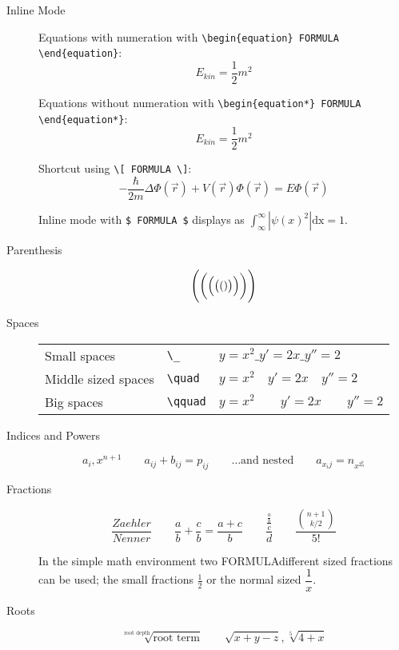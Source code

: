 \documentclass[10pt,a4paper]{scrartcl}
\begin{document}
\begin{description}

\item[Inline Mode]
Equations with numeration with \verb$\begin{equation} FORMULA \end{equation}$:
\begin{equation} 
E_{kin} = \frac 1 2 m^2
\end{equation}

Equations without numeration with \verb$\begin{equation*} FORMULA \end{equation*}$:
\begin{equation*} 
E_{kin} = \frac 1 2 m^2
\end{equation*}

Shortcut using \verb$\[ FORMULA \]$:
\[ -\frac{\hbar}{2m}\Delta\Phi(\vec r) + V(\vec r)\Phi(\vec r) = E\Phi(\vec r) \]

Inline mode with \verb|$ FORMULA $| displays as 
$\int_\infty^\infty |\psi(x)^2|\mathrm{dx} = 1$.

\item[Parenthesis]
\[ \Biggl( \biggl( \Bigl( \bigl( ( ) \bigr) \Bigr) \biggr) \Biggr) \]

\item[Spaces]
\begin{tabular}[t]{lll}
Small spaces        & \verb$\_$     & $ y=x^{2} \_ y'=2x \_  y''=2 $ \\
Middle sized spaces & \verb$\quad$  & $ y=x^{2} \quad y'=2x \quad  y''=2 $ \\
Big spaces          & \verb$\qquad$ & $ y=x^{2} \qquad y'=2x \qquad  y''=2 $
\end{tabular}

\item[Indices and Powers]
\[ a_i, x^{n+1} \qquad a_{ij} + b_{ij} = p_{ij} \qquad 
    \text{\ldots and nested} \qquad
    a_{x_ij} = n_{x^{2^b_n}} \]

\item[Fractions]
\[  \frac{Zaehler}{Nenner} \qquad 
    \frac{a}{b} + \frac{c}{b} = \frac{ a+c}{b} \qquad
    \frac{\frac{\frac{a}{b}}{c}}{d} \qquad
    \frac {{n+1 \choose k/2}} {5!} \]

\noindent In the simple math environment two FORMULAdifferent sized fractions can be 
used; the small fractions $\frac{1}{2}$ or the normal sized $\dfrac{1}{x}$.

\item[Roots]	
\[  \sqrt[\text{root depth}]{\text{root term}} \qquad
    \sqrt{x+y-z}, \sqrt[5]{4+x} \]


\end{description}
\end{document}
